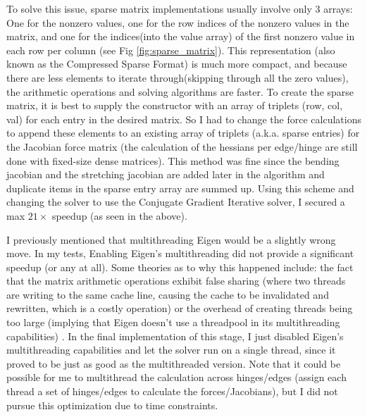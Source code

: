 \documentclass[letterpaper, 10 pt, conference]{ieeeconf}  %
\begin{document}
To solve this issue, sparse matrix implementations usually involve only 3 arrays: One for the nonzero values, one for the row indices of the nonzero values in the matrix, and one for the indices(into the value array) of the first nonzero value in each row per column (see Fig \ref{fig:sparse_matrix}). This representation (also known as the Compressed Sparse Format) is much more compact, and because there are less elements to iterate through(skipping through all the zero values), the arithmetic operations and solving algorithms are faster. To create the sparse matrix, it is best to supply the constructor with an array of triplets (row, col, val) for each entry in the desired matrix. So I had to change the force calculations to append these elements to an existing array of triplets (a.k.a. sparse entries) for the Jacobian force matrix (the calculation of the hessians per edge/hinge are still done with fixed-size dense matrices). This method was fine since the bending jacobian and the stretching jacobian are added later in the algorithm and duplicate items in the sparse entry array are summed up. Using this scheme and changing the solver to use the Conjugate Gradient Iterative solver, I secured a max $21\times$ speedup (as seen in the above).

I previously mentioned that multithreading Eigen would be a slightly wrong move. In my tests, Enabling Eigen's multithreading did not provide a significant speedup (or any at all). Some theories as to why this happened include: the fact that the matrix arithmetic operations exhibit false sharing (where two threads are writing to the same cache line, causing the cache to be invalidated and rewritten, which is a costly operation) or the overhead of creating threads being too large (implying that Eigen doesn't use a threadpool in its multithreading capabilities) \cite{kernel_false_sharing}. In the final implementation of this stage, I just disabled Eigen's multithreading capabilities and let the solver run on a single thread, since it proved to be just as good as the multithreaded version. Note that it could be possible for me to multithread the calculation across hinges/edges (assign each thread a set of hinges/edges to calculate the forces/Jacobians), but I did not pursue this optimization due to time constraints.
\end{document}

